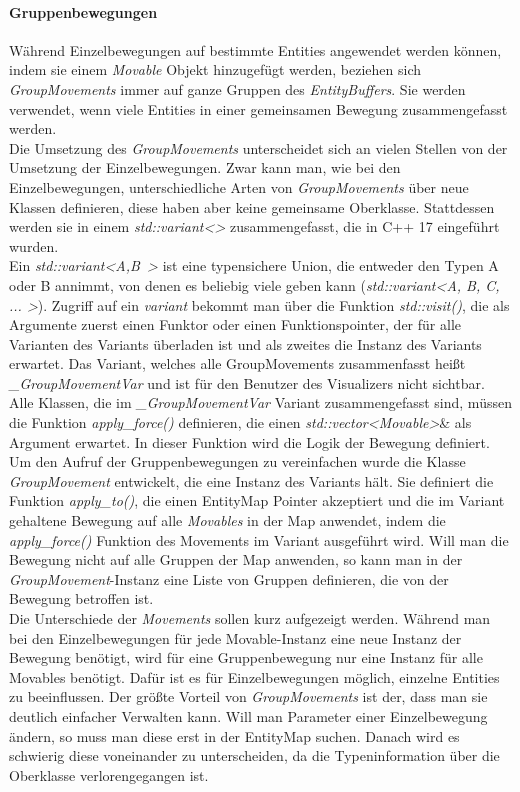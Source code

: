 \documentclass[11pt,a4paper]{article}
\begin{document}
\paragraph{Gruppenbewegungen}
Während Einzelbewegungen auf bestimmte Entities angewendet werden können, indem sie einem \textit{Movable} Objekt hinzugefügt werden, beziehen sich \textit{GroupMovements} immer auf ganze Gruppen des \textit{EntityBuffers}. Sie werden verwendet, wenn viele Entities in einer gemeinsamen Bewegung zusammengefasst werden.\\
Die Umsetzung des \textit{GroupMovements} unterscheidet sich an vielen Stellen von der Umsetzung der Einzelbewegungen. Zwar kann man, wie bei den Einzelbewegungen, unterschiedliche Arten von \textit{GroupMovements} über neue Klassen definieren, diese haben aber keine gemeinsame Oberklasse. Stattdessen werden sie in einem \textit{std::variant\textless \textgreater} zusammengefasst, die in C++ 17 eingeführt wurden.\\
Ein \mbox{\textit{std::variant\textless A,B \textgreater}} ist eine  typensichere Union, die entweder den Typen A oder B annimmt, von denen es beliebig viele geben kann (\textit{std::variant\textless A, B, C, ... \textgreater}). Zugriff auf ein \textit{variant} bekommt man über die Funktion \textit{std::visit()}, die als Argumente zuerst einen Funktor oder einen Funktionspointer, der für alle Varianten des Variants überladen ist und als zweites die Instanz des Variants erwartet. Das Variant, welches alle GroupMovements zusammenfasst heißt \textit{\_GroupMovementVar} und ist für den Benutzer des Visualizers nicht sichtbar. Alle Klassen, die im \textit{\_GroupMovementVar} Variant zusammengefasst sind, müssen die Funktion \textit{apply\_force()} definieren, die einen \textit{std::vector\textless Movable\textgreater}\& als Argument erwartet. In dieser Funktion wird die Logik der Bewegung definiert.\\
Um den Aufruf der Gruppenbewegungen zu vereinfachen wurde die Klasse \textit{GroupMovement} entwickelt, die eine Instanz des Variants hält. Sie definiert die Funktion \textit{apply\_to()}, die einen EntityMap Pointer akzeptiert und die im Variant gehaltene Bewegung auf alle \textit{Movables} in der Map anwendet, indem die \textit{apply\_force()} Funktion des Movements im Variant ausgeführt wird. Will man die Bewegung nicht auf alle Gruppen der Map anwenden, so kann man in der \textit{GroupMovement}-Instanz eine Liste von Gruppen definieren, die von der Bewegung betroffen ist.\\
Die Unterschiede der \textit{Movements} sollen kurz aufgezeigt werden. Während man bei den Einzelbewegungen für jede Movable-Instanz eine neue Instanz der Bewegung benötigt, wird für eine Gruppenbewegung nur eine Instanz für alle Movables benötigt. Dafür ist es für Einzelbewegungen möglich, einzelne Entities zu beeinflussen. Der größte Vorteil von \textit{GroupMovements} ist der, dass man sie deutlich einfacher Verwalten kann. Will man Parameter einer Einzelbewegung ändern, so muss man diese erst in der EntityMap suchen. Danach wird es schwierig diese voneinander zu unterscheiden, da die Typeninformation über die Oberklasse verlorengegangen ist.\\
\end{document}
